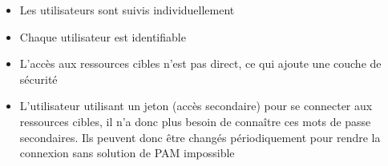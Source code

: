 \begin{itemize}
	\item Les utilisateurs sont suivis individuellement
	\item Chaque utilisateur est identifiable
	\item L'accès aux ressources cibles n'est pas direct, ce qui ajoute une couche de sécurité
	\item L'utilisateur utilisant un jeton (accès secondaire) pour se connecter aux ressources cibles, il n'a donc plus besoin de connaître ces mots de passe secondaires. Ils peuvent donc être changés périodiquement pour rendre la connexion sans solution de PAM impossible
\end{itemize}